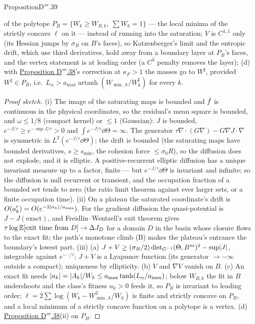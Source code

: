 \begin{thm}{Proposition}{D$'''$.39}
\begin{enumerate}[label=\textup{(\roman*)}]
    of the polytope $P_B = \{W_k\ge W_{B,k},\ \sum W_k = 1\}$ --- the local minima of the strictly concave $\ell$ on it
    --- instead of running into the saturation; $V$ is $C^{1,1}$ only (its Hessian jumps by $\sigma_B$ on $B$'s faces),
    so Katzenberger's limit and the entropic drift, which use third derivatives, hold away from a boundary layer at
    $P_B$'s faces, and the vertex statement is at leading order (a $C^3$ penalty removes the layer); (d) with
    \hyperref[res:thmDppp:38]{Proposition D$'''$.38}'s correction at $\kappa_F > 1$ the masses go to $W^\sharp$,
    provided $W^\sharp\in P_B$, i.e.\ $L_\alpha > a_{\max}\operatorname{artanh}(W_{\min,k}/W^\sharp_k)$ for every $k$.
\end{enumerate}
\end{thm}

\begin{proof}[Proof sketch]
(i) The image of the saturating maps is bounded and $\hat f$ is continuous in the physical coordinates, so the
residual's mean square is bounded, and $\omega\le1/8$ (compact kernel) or $\le1$ (Gaussian): $J$ is bounded,
$e^{-J/\tau}\ge e^{-\sup J/\tau} > 0$ and $\int e^{-J/\tau}\dd\Theta = \infty$. The generator
$\tau\nabla\cdot(G\nabla) - G\nabla J\cdot\nabla$ is symmetric in $L^2(e^{-J/\tau}\dd\Theta)$; the drift is bounded (the
saturating maps have bounded derivatives, $s\ge s_{\min}$, the cohesion force $\le\sigma_0R$), so the diffusion does
not explode, and it is elliptic. A positive-recurrent elliptic diffusion has a unique invariant measure up to a factor,
finite --- but $e^{-J/\tau}\dd\Theta$ is invariant and infinite; so the diffusion is null recurrent or transient, and
the occupation fraction of a bounded set tends to zero (the ratio limit theorem against ever larger sets, or a finite
occupation time). (ii) On a plateau the saturated coordinate's drift is $O(a'_k) = O(e^{-2\lvert \alpha_k\rvert/a_{\max}})$.
For the gradient diffusion the quasi-potential is $J - J(\text{exact})$, and Freidlin--Wentzell's exit theorem gives
$\tau\log\mathbb{E}[\text{exit time from }D]\to\Delta J_D$ for a domain $D$ in the basin whose closure flows to the exact fit;
the path's monotone climb (B) makes the plateau's entrance the boundary's lowest part. (iii) (a)
$J + V\ge(\sigma_B/2)\operatorname{dist}_{G^{-1}}(\Theta,B^m)^2 - \sup\lvert J\rvert$, integrable against $e^{-\cdot/\tau}$;
$J + V$ is a Lyapunov function (its generator $\to-\infty$ outside a compact); uniqueness by ellipticity. (b) $V$ and
$\nabla V$ vanish on $B$. (c) An exact fit needs $\lvert a_k\rvert = \lvert A_k\rvert/W_k\le a_{\max}\tanh(L_\alpha/a_{\max})$; below
$W_{B,k}$ the fit in $B$ undershoots and the class's fitness $u_k > 0$ feeds it, so $P_B$ is invariant to leading
order; $\ell = 2\sum\log(W_k - W_{\min,k}^2/W_k)$ is finite and strictly concave on $P_B$, and a local minimum of a
strictly concave function on a polytope is a vertex. (d) \hyperref[res:thmDppp:38]{Proposition D$'''$.38}(ii) on
$P_B$.
\end{proof}
